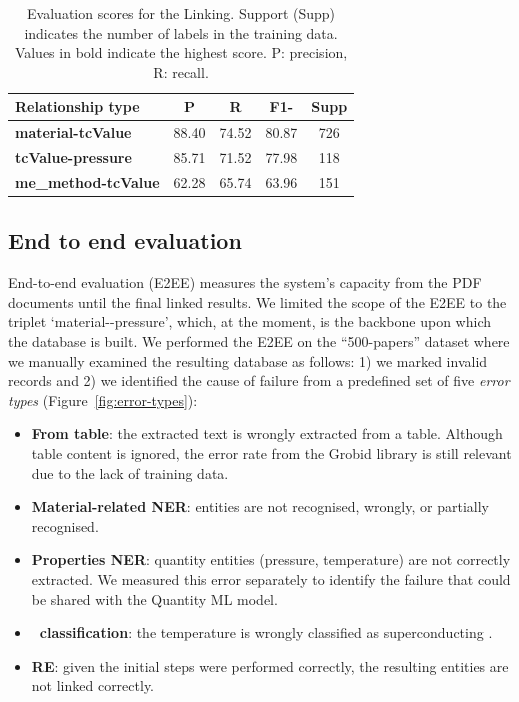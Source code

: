 \begin{table}[htbp]
    \centering
    \caption{Evaluation scores for the Linking. Support (Supp) indicates the number of labels in the training data. Values in bold indicate the highest score. P: precision, R: recall.}
    \begin{tabular}{lcccc}
        \toprule
        \textbf{Relationship type}          & \textbf{P} & \textbf{R} & \textbf{F1-} & Supp \\
        \midrule
        \textbf{material-tcValue}   & 88.40              & 74.52           & 80.87             & 726     \\
        \textbf{tcValue-pressure}   & 85.71              & 71.52           & 77.98             & 118     \\
        \textbf{me\_method-tcValue} & 62.28              & 65.74           & 63.96             & 151     \\
        \bottomrule
    \end{tabular}

    \label{table:evaluation-linking}
\end{table}



\subsection{End to end evaluation}
\label{sec:end2end}
End-to-end evaluation (E2EE) measures the system's capacity from the PDF documents until the final linked results.
We limited the scope of the E2EE to the triplet `material-\tc-pressure', which, at the moment, is the backbone upon which the database is built.
We performed the E2EE on the ``500-papers'' dataset where we manually examined the resulting database as follows: 1) we marked invalid records and 2) we identified the cause of failure from a predefined set of five \textit{error types} (Figure~\ref{fig:error-types}):
\begin{itemize}
    \item \textbf{From table}: the extracted text is wrongly extracted from a table. Although table content is ignored, the error rate from the Grobid library is still relevant due to the lack of training data.
    \item \textbf{Material-related NER}: entities are not recognised, wrongly, or partially recognised.
    \item \textbf{Properties NER}: quantity entities (pressure, temperature) are not correctly extracted. We measured this error separately to identify the failure that could be shared with the Quantity ML model.
    \item \textbf{\tc~classification}: the temperature is wrongly classified as superconducting \tc.
    \item \textbf{RE}: given the initial steps were performed correctly, the resulting entities are not linked correctly.
\end{itemize}

